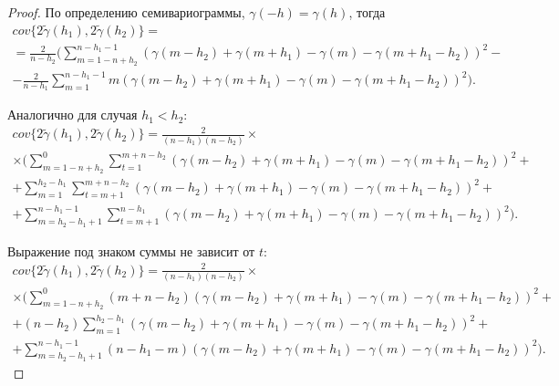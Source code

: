 \begin{proof}
По определению семивариограммы, $ \gamma(-h) = \gamma(h) $, тогда
\begin{equation}\begin{gathered}
\label{eq:cov1}
	cov\{ 2 \tilde{\gamma}(h_1), 2 \tilde{\gamma}(h_2) \} = \\
	= \frac{2}{n - h_2} (\sum_{m = 1 - n + h_2}^{n - h_1 - 1} (\gamma(m - h_2) + \gamma(m + h_1) - \gamma(m) - \gamma(m + h_1 - h_2))^2 - \\
	- \frac{2}{n - h_1} \sum_{m = 1}^{n - h_1 - 1} m (\gamma(m - h_2) + \gamma(m + h_1) - \gamma(m) - \gamma(m + h_1 - h_2))^2).
\end{gathered}\end{equation}

Аналогично для случая $h_1 < h_2$:
\begin{equation*}\begin{gathered}
	cov\{ 2 \tilde{\gamma}(h_1), 2 \tilde{\gamma}(h_2) \} = \frac{2}{(n - h_1) (n - h_2)} \times \\
	\times (\sum_{m = 1 - n + h_2}^{0}\sum_{t = 1}^{m + n - h_2}(\gamma(m - h_2) + \gamma(m + h_1) - \gamma(m) - \gamma(m + h_1 - h_2))^2 + \\
	+ \sum_{m = 1}^{h_2 - h_1}\sum_{t = m + 1}^{m + n - h_2}(\gamma(m - h_2) + \gamma(m + h_1) - \gamma(m) - \gamma(m + h_1 - h_2))^2 + \\
	+ \sum_{m = h_2 - h_1 + 1}^{n - h_1 - 1}\sum_{t = m + 1}^{n - h_1}(\gamma(m - h_2) + \gamma(m + h_1) - \gamma(m) - \gamma(m + h_1 - h_2))^2).
\end{gathered}\end{equation*}

Выражение под знаком суммы не зависит от $t$:
\begin{equation*}\begin{gathered}
	cov\{ 2 \tilde{\gamma}(h_1), 2 \tilde{\gamma}(h_2) \} = \frac{2}{(n - h_1) (n - h_2)} \times \\
	\times (\sum_{m = 1 - n + h_2}^{0}(m + n - h_2)(\gamma(m - h_2) + \gamma(m + h_1) - \gamma(m) - \gamma(m + h_1 - h_2))^2 + \\
	+ (n - h_2)\sum_{m = 1}^{h_2 - h_1}(\gamma(m - h_2) + \gamma(m + h_1) - \gamma(m) - \gamma(m + h_1 - h_2))^2 + \\
	+ \sum_{m = h_2 - h_1 + 1}^{n - h_1 - 1}(n - h_1 - m)(\gamma(m - h_2) + \gamma(m + h_1) - \gamma(m) - \gamma(m + h_1 - h_2))^2).
\end{gathered}\end{equation*}


\end{proof}
